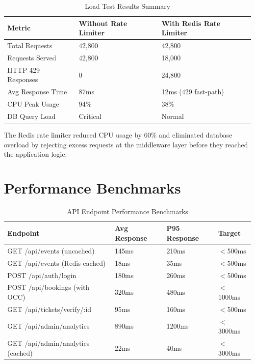 \documentclass[12pt,a4paper]{report}
\begin{document}
\begin{table}[H]
    \centering
    \caption{Load Test Results Summary}
    \vspace{0.2cm}
    \begin{tabular}{|p{4cm}|p{4cm}|p{4cm}|}
        \hline
        \textbf{Metric} & \textbf{Without Rate Limiter} & \textbf{With Redis Rate Limiter} \\
        \hline
        Total Requests & 42,800 & 42,800 \\
        \hline
        Requests Served & 42,800 & 18,000 \\
        \hline
        HTTP 429 Responses & 0 & 24,800 \\
        \hline
        Avg Response Time & 87ms & 12ms (429 fast-path) \\
        \hline
        CPU Peak Usage & 94\% & 38\% \\
        \hline
        DB Query Load & Critical & Normal \\
        \hline
    \end{tabular}
\end{table}

The Redis rate limiter reduced CPU usage by 60\% and eliminated database overload by rejecting excess requests at the middleware layer before they reached the application logic.

\section{Performance Benchmarks}

\begin{table}[H]
    \centering
    \caption{API Endpoint Performance Benchmarks}
    \vspace{0.2cm}
    \begin{tabular}{|p{5cm}|p{3cm}|p{3cm}|p{3cm}|}
        \hline
        \textbf{Endpoint} & \textbf{Avg Response} & \textbf{P95 Response} & \textbf{Target} \\
        \hline
        GET /api/events (uncached) & 145ms & 210ms & $<$500ms \\
        \hline
        GET /api/events (Redis cached) & 18ms & 35ms & $<$500ms \\
        \hline
        POST /api/auth/login & 180ms & 260ms & $<$500ms \\
        \hline
        POST /api/bookings (with OCC) & 320ms & 480ms & $<$1000ms \\
        \hline
        GET /api/tickets/verify/:id & 95ms & 160ms & $<$500ms \\
        \hline
        GET /api/admin/analytics & 890ms & 1200ms & $<$3000ms \\
        \hline
        GET /api/admin/analytics (cached) & 22ms & 40ms & $<$3000ms \\
        \hline
    \end{tabular}
\end{table}
\end{document}
